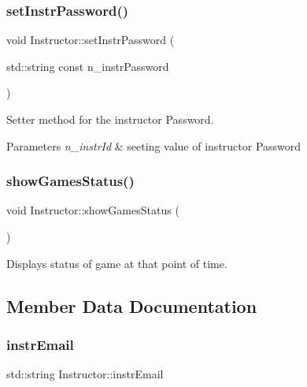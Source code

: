 \subsubsection{\texorpdfstring{set\+Instr\+Password()}{setInstrPassword()}}
{\footnotesize\ttfamily void Instructor\+::set\+Instr\+Password (\begin{DoxyParamCaption}\item[{std\+::string const}]{n\+\_\+instr\+Password }\end{DoxyParamCaption})}



Setter method for the instructor Password. 


\begin{DoxyParams}{Parameters}
{\em n\+\_\+instr\+Id} & seeting value of instructor Password \\
\hline
\end{DoxyParams}
\mbox{\label{class_instructor_a94f9564009326b43a3029fd3419e467b}} 
\subsubsection{\texorpdfstring{show\+Games\+Status()}{showGamesStatus()}}
{\footnotesize\ttfamily void Instructor\+::show\+Games\+Status (\begin{DoxyParamCaption}{ }\end{DoxyParamCaption})\hspace{0.3cm}{\ttfamily [private]}}



Displays status of game at that point of time. 



\subsection{Member Data Documentation}
\mbox{\label{class_instructor_aa32f70770889ea70fd9e37b176b3d35a}} 
\subsubsection{\texorpdfstring{instr\+Email}{instrEmail}}
{\footnotesize\ttfamily std\+::string Instructor\+::instr\+Email\hspace{0.3cm}{\ttfamily [private]}}




